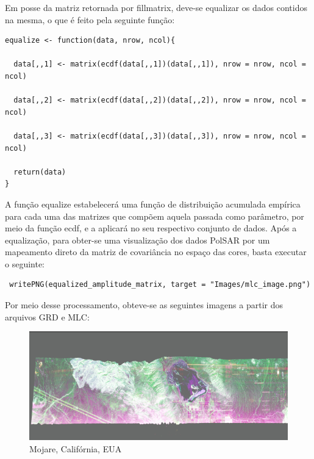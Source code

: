 \documentclass[12pt]{article}
\begin{document}
Em posse da matriz retornada por fill\textunderscore matrix, deve-se equalizar os dados contidos na mesma, o que é feito pela seguinte função:

\begin{verbatim}
equalize <- function(data, nrow, ncol){
  
  data[,,1] <- matrix(ecdf(data[,,1])(data[,,1]), nrow = nrow, ncol = ncol)
  
  data[,,2] <- matrix(ecdf(data[,,2])(data[,,2]), nrow = nrow, ncol = ncol)
  
  data[,,3] <- matrix(ecdf(data[,,3])(data[,,3]), nrow = nrow, ncol = ncol)  
  
  return(data)
}
\end{verbatim}

A função equalize estabelecerá uma função de distribuição acumulada empírica para cada uma das matrizes que compõem aquela passada como parâmetro, por meio da função ecdf, e a aplicará no seu respectivo conjunto de dados. Após a equalização, para obter-se uma visualização dos dados PolSAR por um mapeamento direto da matriz de covariância no espaço das cores, basta executar o seguinte:

\begin{verbatim}
 writePNG(equalized_amplitude_matrix, target = "Images/mlc_image.png")
\end{verbatim}

Por meio desse processamento, obteve-se as seguintes imagens a partir dos arquivos GRD e MLC:

\begin{figure}[!ht]
	\begin{center}
		\includegraphics[width = 120mm, scale = 0.5]{../../Images/Report_07_18/grd_image_low_resolution} \\ 
        Mojare, Califórnia, EUA\\
	\end{center}
\end{figure}
\end{document}
